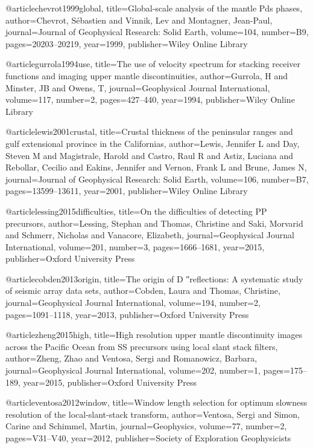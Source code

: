 @article{chevrot1999global,
  title={Global-scale analysis of the mantle Pds phases},
  author={Chevrot, S{\'e}bastien and Vinnik, Lev and Montagner, Jean-Paul},
  journal={Journal of Geophysical Research: Solid Earth},
  volume={104},
  number={B9},
  pages={20203--20219},
  year={1999},
  publisher={Wiley Online Library}
}


@article{gurrola1994use,
  title={The use of velocity spectrum for stacking receiver functions and imaging upper mantle discontinuities},
  author={Gurrola, H and Minster, JB and Owens, T},
  journal={Geophysical Journal International},
  volume={117},
  number={2},
  pages={427--440},
  year={1994},
  publisher={Wiley Online Library}
}


@article{lewis2001crustal,
  title={Crustal thickness of the peninsular ranges and gulf extensional province in the Californias},
  author={Lewis, Jennifer L and Day, Steven M and Magistrale, Harold and Castro, Raul R and Astiz, Luciana and Rebollar, Cecilio and Eakins, Jennifer and Vernon, Frank L and Brune, James N},
  journal={Journal of Geophysical Research: Solid Earth},
  volume={106},
  number={B7},
  pages={13599--13611},
  year={2001},
  publisher={Wiley Online Library}
}


@article{lessing2015difficulties,
  title={On the difficulties of detecting PP precursors},
  author={Lessing, Stephan and Thomas, Christine and Saki, Morvarid and Schmerr, Nicholas and Vanacore, Elizabeth},
  journal={Geophysical Journal International},
  volume={201},
  number={3},
  pages={1666--1681},
  year={2015},
  publisher={Oxford University Press}
}

@article{cobden2013origin,
  title={The origin of D ″reflections: A systematic study of seismic array data sets},
  author={Cobden, Laura and Thomas, Christine},
  journal={Geophysical Journal International},
  volume={194},
  number={2},
  pages={1091--1118},
  year={2013},
  publisher={Oxford University Press}
}


@article{zheng2015high,
  title={High resolution upper mantle discontinuity images across the Pacific Ocean from SS precursors using local slant stack filters},
  author={Zheng, Zhao and Ventosa, Sergi and Romanowicz, Barbara},
  journal={Geophysical Journal International},
  volume={202},
  number={1},
  pages={175--189},
  year={2015},
  publisher={Oxford University Press}
}

@article{ventosa2012window,
  title={Window length selection for optimum slowness resolution of the local-slant-stack transform},
  author={Ventosa, Sergi and Simon, Carine and Schimmel, Martin},
  journal={Geophysics},
  volume={77},
  number={2},
  pages={V31--V40},
  year={2012},
  publisher={Society of Exploration Geophysicists}
}

